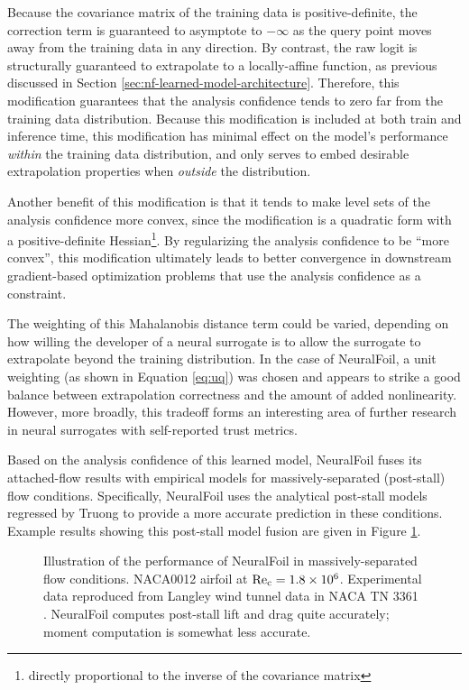     Because the covariance matrix of the training data is positive-definite, the correction term is guaranteed to asymptote to $-\infty$ as the query point moves away from the training data in any direction. By contrast, the raw logit is structurally guaranteed to extrapolate to a locally-affine function, as previous discussed in Section \ref{sec:nf-learned-model-architecture}. Therefore, this modification guarantees that the analysis confidence tends to zero far from the training data distribution. Because this modification is included at both train and inference time, this modification has minimal effect on the model's performance \textit{within} the training data distribution, and only serves to embed desirable extrapolation properties when \textit{outside} the distribution.

    Another benefit of this modification is that it tends to make level sets of the analysis confidence more convex, since the modification is a quadratic form with a positive-definite Hessian\footnote{directly proportional to the inverse of the covariance matrix}. By regularizing the analysis confidence to be ``more convex'', this modification ultimately leads to better convergence in downstream gradient-based optimization problems that use the analysis confidence as a constraint.

    The weighting of this Mahalanobis distance term could be varied, depending on how willing the developer of a neural surrogate is to allow the surrogate to extrapolate beyond the training distribution. In the case of NeuralFoil, a unit weighting (as shown in Equation \ref{eq:uq}) was chosen and appears to strike a good balance between extrapolation correctness and the amount of added nonlinearity. However, more broadly, this tradeoff forms an interesting area of further research in neural surrogates with self-reported trust metrics.

    Based on the analysis confidence of this learned model, NeuralFoil fuses its attached-flow results with empirical models for massively-separated (post-stall) flow conditions. Specifically, NeuralFoil uses the analytical post-stall models regressed by Truong \cite{truong_analytical_2020} to provide a more accurate prediction in these conditions. Example results showing this post-stall model fusion are given in Figure \ref{fig:post_stall_extrapolation}.

    \begin{figure}[H]
        \centering
        
        \caption{Illustration of the performance of NeuralFoil in massively-separated flow conditions. NACA0012 airfoil at $\rm Re_c=1.8\times 10^6$. Experimental data reproduced from Langley wind tunnel data in NACA TN 3361 \cite{critzos_aerodynamic_1955}. NeuralFoil computes post-stall lift and drag quite accurately; moment computation is somewhat less accurate.}
        \label{fig:post_stall_extrapolation}
    \end{figure}

